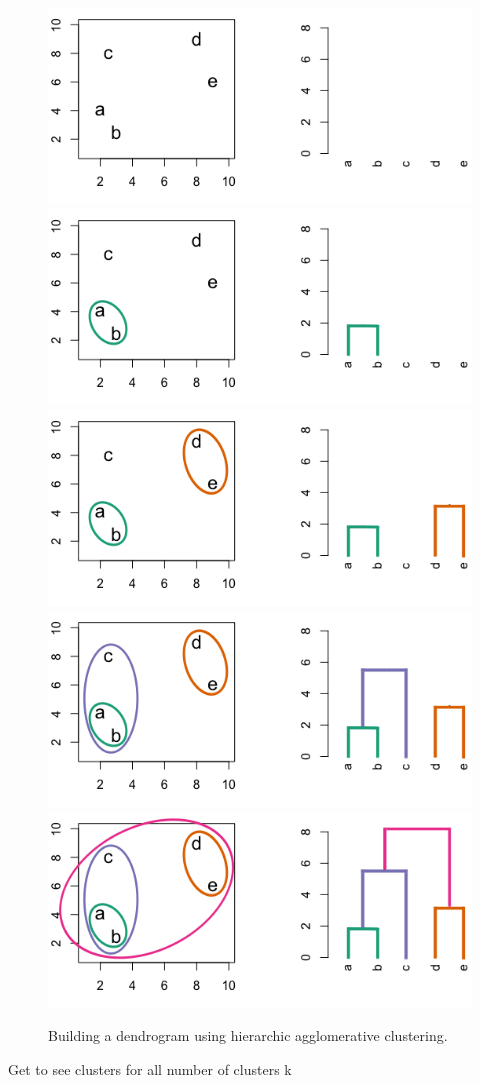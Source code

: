 \documentclass[]{book}
\theoremstyle{definition}
\theoremstyle{definition}
\theoremstyle{definition}
\theoremstyle{remark}
\begin{document}
\begin{figure}

{\centering \includegraphics[width=0.55\linewidth]{images/hclust_demo_0} \includegraphics[width=0.55\linewidth]{images/hclust_demo_1} \includegraphics[width=0.55\linewidth]{images/hclust_demo_2} \includegraphics[width=0.55\linewidth]{images/hclust_demo_3} \includegraphics[width=0.55\linewidth]{images/hclust_demo_4} 

}

\caption{Building a dendrogram using hierarchic agglomerative clustering.}\label{fig:hierarchicClusteringDemo}
\end{figure}

Get to see clusters for all number of clusters k
\end{document}
